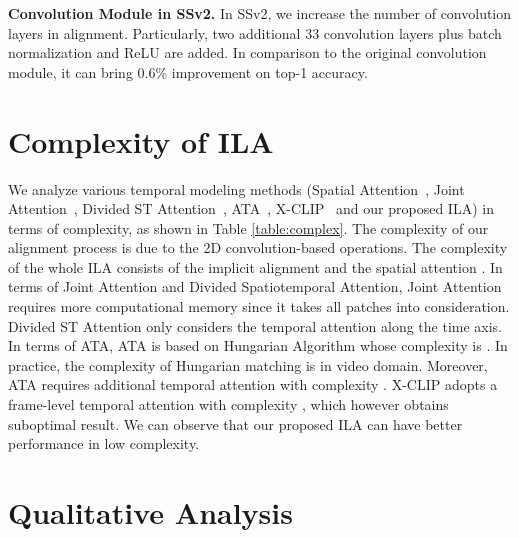 \documentclass[10pt,twocolumn,letterpaper]{article}
\begin{document}
\noindent \textbf{Convolution Module in SSv2.} 
In SSv2, we increase the number of convolution layers in alignment.
Particularly, two additional 33 convolution layers plus batch normalization and ReLU are added.
In comparison to the original convolution module, it can bring 0.6\% improvement on top-1 accuracy.








\section{Complexity of ILA} 
We analyze various temporal modeling methods (Spatial Attention~\cite{b13}, Joint Attention~\cite{b13}, Divided ST Attention~\cite{b13}, ATA~\cite{b28}, X-CLIP~\cite{b24} and our proposed ILA) in terms of complexity, as shown in Table \ref{table:complex}. 
The complexity of our alignment process is  due to the 2D convolution-based operations. 
The complexity of the whole ILA consists of the implicit alignment  and the spatial attention . 
In terms of Joint Attention and Divided Spatiotemporal Attention, Joint Attention requires more computational memory since it takes all patches into consideration. 
Divided ST Attention only considers the temporal attention along the time axis.
In terms of ATA, ATA is based on Hungarian Algorithm whose complexity is . In practice, the complexity of Hungarian matching is  in video domain. 
Moreover, ATA requires additional temporal attention with complexity . 
X-CLIP adopts a frame-level temporal attention with complexity , which however obtains suboptimal result.
We can observe that our proposed ILA can have better performance in low complexity.

\section{Qualitative Analysis}
\end{document}
